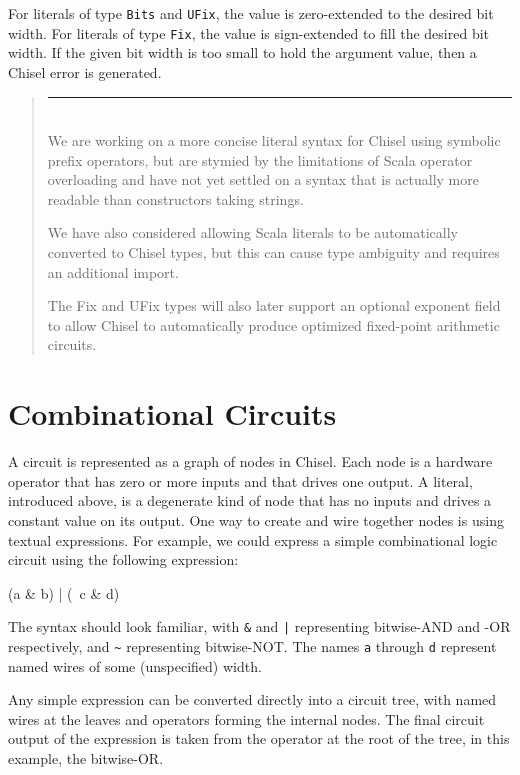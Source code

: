 \documentclass[twocolumn,10pt]{article}
\newenvironment{commentary}
{ \vspace{-0.1in}
  \begin{quotation}
  \noindent
  \small \em
  \rule{\linewidth}{1pt}\\
}
{
  \end{quotation}
}
\def\code#1{{\tt #1}}
\begin{document}
\noindent
For literals of type \code{Bits} and \code{UFix}, the value is
zero-extended to the desired bit width.  For literals of type
\code{Fix}, the value is sign-extended to fill the desired bit width.
If the given bit width is too small to hold the argument value, then a
Chisel error is generated.

\begin{commentary}
We are working on a more concise literal syntax for Chisel using
symbolic prefix operators, but are stymied by the limitations of Scala
operator overloading and have not yet settled on a syntax that is
actually more readable than constructors taking strings.

We have also considered allowing Scala literals to be automatically
converted to Chisel types, but this can cause type ambiguity and
requires an additional import.

The Fix and UFix types will also later support an optional exponent
field to allow Chisel to automatically produce optimized fixed-point
arithmetic circuits.
\end{commentary}

\section{Combinational Circuits}

A circuit is represented as a graph of nodes in Chisel.  Each node is
a hardware operator that has zero or more inputs and that drives one
output.  A literal, introduced above, is a degenerate kind of node
that has no inputs and drives a constant value on its output.  One way
to create and wire together nodes is using textual expressions.  For
example, we could express a simple combinational logic circuit
using the following expression:

\begin{scala}
(a & b) | (~c & d)
\end{scala}

The syntax should look familiar, with \code{\&} and \code{|}
representing bitwise-AND and -OR respectively, and \code{\~{}}
representing bitwise-NOT.  The names \code{a} through \code{d}
represent named wires of some (unspecified) width.

Any simple expression can be converted directly into a circuit tree,
with named wires at the leaves and operators forming the internal
nodes.  The final circuit output of the expression is taken from the
operator at the root of the tree, in this example, the bitwise-OR.
\end{document}
